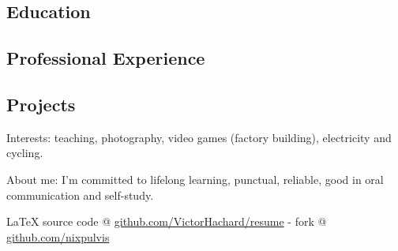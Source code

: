 \documentclass[10pt,a4paper]{article}
\newcommand{\latex}{\LaTeX\xspace}
\newenvironment{indentsection}[1]
{\begin{list}{}
  {\setlength{\leftmargin}{#1}} \item[]
}
{\end{list}}
\begin{document}


\vspace{-0.2em}


\subsection*{Education}


\subsection*{Professional Experience}


\subsection*{Projects}


\begin{indentsection}{\parindent}
\begin{description*}
\item[Interests:]
  teaching, photography, video games (factory building), electricity and cycling.
\item[About me:]
  I’m committed to lifelong learning, punctual, reliable,
  good in oral communication and self-study.
\end{description*}
\end{indentsection}

\begin{center}
\footnotesize \latex source code @
\href{http://www.github.com/VictorHachard/resume}
{github.com/VictorHachard/resume} - fork @
\href{http://www.github.com/nixpulvis}
{github.com/nixpulvis}
\end{center}
\end{document}
